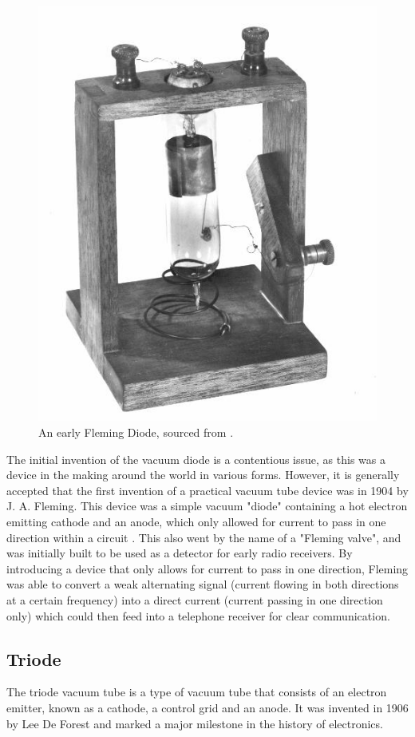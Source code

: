 \begin{figure}
    \centering
    \includegraphics[width=0.6\linewidth]{gfx/fleming_diode.jpg}
    \caption{An early Fleming Diode, sourced from \cite{ethw:2008}.}
    \label{fig:fleming_diode}
\end{figure}

The initial invention of the vacuum diode is a contentious issue, as this was a device in the making around the world in various forms. However, it is generally accepted that the first invention of a practical vacuum tube device was in 1904 by J. A. Fleming. This device was a simple vacuum "diode" containing a hot electron emitting cathode and an anode, which only allowed for current to pass in one direction within a circuit \cite{fleming:1905}. This also went by the name of a "Fleming valve", and was initially built to be used as a detector for early radio receivers. By introducing a device that only allows for current to pass in one direction, Fleming was able to convert a weak alternating signal (current flowing in both directions at a certain frequency) into a direct current (current passing in one direction only) which could then feed into a telephone receiver for clear communication.%

\subsection{Triode}
The triode vacuum tube is a type of vacuum tube that consists of an electron emitter, known as a cathode, a control grid and an anode. It was invented in 1906 by Lee De Forest and marked a major milestone in the history of electronics.

